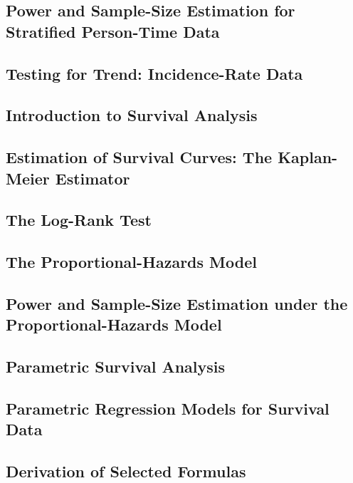 \documentclass[12pt,]{article}
\theoremstyle{definition}
\theoremstyle{definition}
\theoremstyle{definition}
\theoremstyle{remark}
\begin{document}
\subsection{Power and Sample-Size Estimation for Stratified Person-Time
Data}\label{power-and-sample-size-estimation-for-stratified-person-time-data}

\subsection{Testing for Trend: Incidence-Rate
Data}\label{testing-for-trend-incidence-rate-data}

\subsection{Introduction to Survival
Analysis}\label{introduction-to-survival-analysis}

\subsection{Estimation of Survival Curves: The Kaplan-Meier
Estimator}\label{estimation-of-survival-curves-the-kaplan-meier-estimator}

\subsection{The Log-Rank Test}\label{the-log-rank-test}

\subsection{The Proportional-Hazards
Model}\label{the-proportional-hazards-model}

\subsection{Power and Sample-Size Estimation under the
Proportional-Hazards
Model}\label{power-and-sample-size-estimation-under-the-proportional-hazards-model}

\subsection{Parametric Survival
Analysis}\label{parametric-survival-analysis}

\subsection{Parametric Regression Models for Survival
Data}\label{parametric-regression-models-for-survival-data}

\subsection{Derivation of Selected
Formulas}\label{derivation-of-selected-formulas-1}


\end{document}
